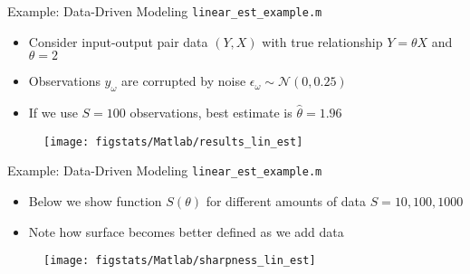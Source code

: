 \documentclass[handout,9pt]{beamer}
\begin{document}
%
\begin{frame}{Example: Data-Driven Modeling \footnotesize{\texttt{linear\_est\_example.m}}}

\begin{block}{}
\begin{itemize}
\setlength{\itemsep}{10pt}
\item Consider input-output pair data $(Y,X)$ with true relationship $Y=\theta X$ and $\theta=2$
\item Observations $y_\omega$ are corrupted by noise $\epsilon_\omega  \sim \mathcal{N}(0,0.25)$
\item If we use $S=100$ observations, best estimate is $\hat{\theta}=1.96$ 
\end{itemize}
\end{block}

\begin{figure}[!htb]
    \centering
	\texttt{[image: figstats/Matlab/results\_lin\_est]}
\end{figure}

\end{frame}

%
\begin{frame}{Example: Data-Driven Modeling \footnotesize{\texttt{linear\_est\_example.m}}}

\begin{block}{}
\begin{itemize}
\setlength{\itemsep}{5pt}
\item Below we show function $S(\theta)$ for different amounts of data $S=10,100,1000$
\item Note how surface becomes better defined as we add data
\end{itemize}
\end{block}

\begin{figure}[!htb]
    \centering
	\texttt{[image: figstats/Matlab/sharpness\_lin\_est]}
\end{figure}

\end{frame}
\end{document}

